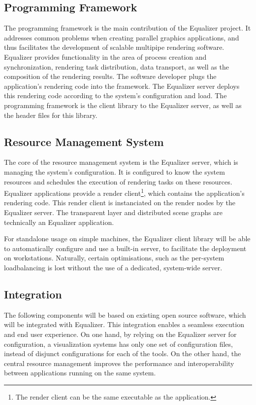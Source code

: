 \documentclass[10pt,a4paper]{scrartcl}
\begin{document}
\subsection{Programming Framework}

The programming framework is the main contribution of the Equalizer
project. It addresses common problems when creating parallel graphics
applications, and thus facilitates the development of scalable multipipe
rendering software. Equalizer provides functionality in the area of
process creation and synchronization, rendering task distribution, data
transport, as well as the composition of the rendering results. The
software developer plugs the application's rendering code into the
framework. The Equalizer server deploys this rendering code according to
the system's configuration and load. The programming framework is the
client library to the Equalizer server, as well as the header files for
this library.

\subsection{Resource Management System}

The core of the resource management system is the Equalizer server,
which is managing the system's configuration. It is configured to know
the system resources and schedules the execution of rendering tasks on
these resources. Equalizer applications provide a render
client\footnote{The render client can be the same executable as the
  application.}, which contains the application's rendering code. This
render client is instanciated on the render nodes by the Equalizer
server. The transparent layer and distributed scene graphs are
technically an Equalizer application.

For standalone usage on simple machines, the Equalizer client library
will be able to automatically configure and use a built-in server, to
facilitate the deployment on workstations. Naturally, certain
optimisations, such as the per-system loadbalancing is lost without the
use of a dedicated, system-wide server.

\subsection{Integration}
The following components will be based on existing open source software, which
will be integrated with Equalizer. This integration enables a seamless
execution and end user experience. On one hand, by relying on the
Equalizer server for configuration, a visualization systems has only
one set of configuration files, instead of disjunct configurations for
each of the tools. On the other hand, the central resource management improves
the performance and interoperability between applications running on
the same system.
\end{document}
